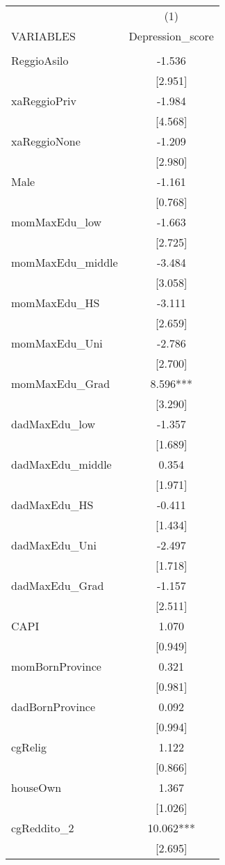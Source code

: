 \documentclass[]{article}
\begin{document}
\begin{tabular}{lc} \hline
 & (1) \\
VARIABLES & Depression\_score \\ \hline
 &  \\
ReggioAsilo & -1.536 \\
 & [2.951] \\
xaReggioPriv & -1.984 \\
 & [4.568] \\
xaReggioNone & -1.209 \\
 & [2.980] \\
Male & -1.161 \\
 & [0.768] \\
momMaxEdu\_low & -1.663 \\
 & [2.725] \\
momMaxEdu\_middle & -3.484 \\
 & [3.058] \\
momMaxEdu\_HS & -3.111 \\
 & [2.659] \\
momMaxEdu\_Uni & -2.786 \\
 & [2.700] \\
momMaxEdu\_Grad & 8.596*** \\
 & [3.290] \\
dadMaxEdu\_low & -1.357 \\
 & [1.689] \\
dadMaxEdu\_middle & 0.354 \\
 & [1.971] \\
dadMaxEdu\_HS & -0.411 \\
 & [1.434] \\
dadMaxEdu\_Uni & -2.497 \\
 & [1.718] \\
dadMaxEdu\_Grad & -1.157 \\
 & [2.511] \\
CAPI & 1.070 \\
 & [0.949] \\
momBornProvince & 0.321 \\
 & [0.981] \\
dadBornProvince & 0.092 \\
 & [0.994] \\
cgRelig & 1.122 \\
 & [0.866] \\
houseOwn & 1.367 \\
 & [1.026] \\
cgReddito\_2 & 10.062*** \\
 & [2.695] \\

\end{tabular}
\end{document}
